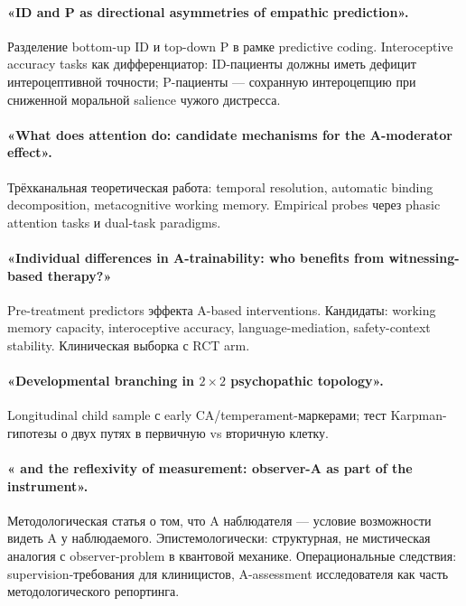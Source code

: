 \paragraph{«ID and P as directional asymmetries of empathic prediction».} Разделение bottom-up ID и top-down P в рамке predictive coding. Interoceptive accuracy tasks как дифференциатор: ID-пациенты должны иметь дефицит интероцептивной точности; P-пациенты --- сохранную интероцепцию при сниженной моральной salience чужого дистресса.

\paragraph{«What does attention do: candidate mechanisms for the A-moderator effect».} Трёхканальная теоретическая работа: temporal resolution, automatic binding decomposition, metacognitive working memory. Empirical probes через phasic attention tasks и dual-task paradigms.

\paragraph{«Individual differences in A-trainability: who benefits from witnessing-based therapy?»} Pre-treatment predictors эффекта A-based interventions. Кандидаты: working memory capacity, interoceptive accuracy, language-mediation, safety-context stability. Клиническая выборка с RCT arm.

\paragraph{«Developmental branching in $2\times 2$ psychopathic topology».} Longitudinal child sample с early CA/temperament-маркерами; тест Karpman-гипотезы о двух путях в первичную vs вторичную клетку.

\paragraph{«\DEIC{} and the reflexivity of measurement: observer-A as part of the instrument».} Методологическая статья о том, что A наблюдателя --- условие возможности видеть A у наблюдаемого. Эпистемологически: структурная, не мистическая аналогия с observer-problem в квантовой механике. Операциональные следствия: supervision-требования для клиницистов, A-assessment исследователя как часть методологического репортинга.

